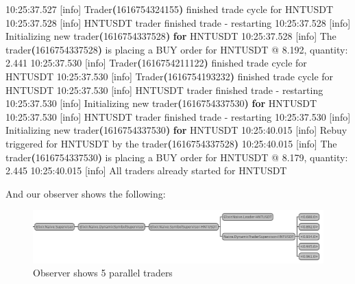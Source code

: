 \documentclass[
  oneside]{book}
\newenvironment{Shaded}{\begin{snugshade}}{\end{snugshade}}
\newcommand{\AttributeTok}[1]{\textcolor[rgb]{0.77,0.63,0.00}{#1}}
\newcommand{\ControlFlowTok}[1]{\textcolor[rgb]{0.13,0.29,0.53}{\textbf{#1}}}
\newcommand{\ErrorTok}[1]{\textcolor[rgb]{0.64,0.00,0.00}{\textbf{#1}}}
\newcommand{\ExtensionTok}[1]{#1}
\newcommand{\KeywordTok}[1]{\textcolor[rgb]{0.13,0.29,0.53}{\textbf{#1}}}
\newcommand{\NormalTok}[1]{#1}
\begin{document}
\begin{Shaded}
\begin{Highlighting}[]
\ExtensionTok{10:25:37.527}\NormalTok{ [info]  Trader}\ErrorTok{(}\ExtensionTok{1616754324155}\KeywordTok{)} \ExtensionTok{finished}\NormalTok{ trade cycle for HNTUSDT}
\ExtensionTok{10:25:37.528}\NormalTok{ [info]  HNTUSDT trader finished trade }\AttributeTok{{-}}\NormalTok{ restarting}
\ExtensionTok{10:25:37.528}\NormalTok{ [info]  Initializing new trader}\ErrorTok{(}\ExtensionTok{1616754337528}\KeywordTok{)} \ControlFlowTok{for}\NormalTok{ HNTUSDT}
\ExtensionTok{10:25:37.528}\NormalTok{ [info]  The trader}\ErrorTok{(}\ExtensionTok{1616754337528}\KeywordTok{)} \ExtensionTok{is}\NormalTok{ placing a BUY order for HNTUSDT @ 8.192, quantity: 2.441}
\ExtensionTok{10:25:37.530}\NormalTok{ [info]  Trader}\ErrorTok{(}\ExtensionTok{1616754211122}\KeywordTok{)} \ExtensionTok{finished}\NormalTok{ trade cycle for HNTUSDT}
\ExtensionTok{10:25:37.530}\NormalTok{ [info]  Trader}\ErrorTok{(}\ExtensionTok{1616754193232}\KeywordTok{)} \ExtensionTok{finished}\NormalTok{ trade cycle for HNTUSDT}
\ExtensionTok{10:25:37.530}\NormalTok{ [info]  HNTUSDT trader finished trade }\AttributeTok{{-}}\NormalTok{ restarting}
\ExtensionTok{10:25:37.530}\NormalTok{ [info]  Initializing new trader}\ErrorTok{(}\ExtensionTok{1616754337530}\KeywordTok{)} \ControlFlowTok{for}\NormalTok{ HNTUSDT}
\ExtensionTok{10:25:37.530}\NormalTok{ [info]  HNTUSDT trader finished trade }\AttributeTok{{-}}\NormalTok{ restarting}
\ExtensionTok{10:25:37.530}\NormalTok{ [info]  Initializing new trader}\ErrorTok{(}\ExtensionTok{1616754337530}\KeywordTok{)} \ControlFlowTok{for}\NormalTok{ HNTUSDT}
\ExtensionTok{10:25:40.015}\NormalTok{ [info]  Rebuy triggered for HNTUSDT by the trader}\ErrorTok{(}\ExtensionTok{1616754337528}\KeywordTok{)}
\ExtensionTok{10:25:40.015}\NormalTok{ [info]  The trader}\ErrorTok{(}\ExtensionTok{1616754337530}\KeywordTok{)} \ExtensionTok{is}\NormalTok{ placing a BUY order for HNTUSDT @ 8.179, quantity: 2.445}
\ExtensionTok{10:25:40.015}\NormalTok{ [info]  All traders already started for HNTUSDT}
\end{Highlighting}
\end{Shaded}

And our observer shows the following:

\begin{figure}
\centering
\includegraphics{images/chapter_09_supervision_tree.png}
\caption{Observer shows 5 parallel traders}
\end{figure}
\end{document}
